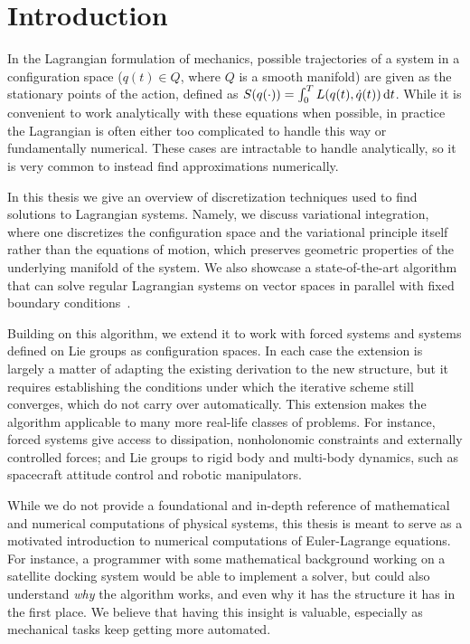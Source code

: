 \chapter{Introduction}

In the Lagrangian formulation of mechanics, possible trajectories of a system in a configuration space ($q(t) \in Q$, where $Q$ is a smooth manifold) are given as the stationary points of the action, defined as $S(q(\cdot)) =\int_0^T L(q(t), \dot{q}(t)) \odif{t}$. While it is convenient to work analytically with these equations when possible, in practice the Lagrangian is often either too complicated to handle this way or fundamentally numerical. These cases are intractable to handle analytically, so it is very common to instead find approximations numerically.

In this thesis we give an overview of discretization techniques used to find solutions to Lagrangian systems. Namely, we discuss variational integration, where one discretizes the configuration space and the variational principle itself rather than the equations of motion, which preserves geometric properties of the underlying manifold of the system. We also showcase a state-of-the-art algorithm that can solve regular Lagrangian systems on vector spaces in parallel with fixed boundary conditions~\cite{ferraroParallelIterativeMethod2025}.

Building on this algorithm, we extend it to work with forced systems and systems defined on Lie groups as configuration spaces. In each case the extension is largely a matter of adapting the existing derivation to the new structure, but it requires establishing the conditions under which the iterative scheme still converges, which do not carry over automatically. This extension makes the algorithm applicable to many more real-life classes of problems. For instance, forced systems give access to dissipation, nonholonomic constraints and externally controlled forces; and Lie groups to rigid body and multi-body dynamics, such as spacecraft attitude control and robotic manipulators.

While we do not provide a foundational and in-depth reference of mathematical and numerical computations of physical systems, this thesis is meant to serve as a motivated introduction to numerical computations of Euler-Lagrange equations. For instance, a programmer with some mathematical background working on a satellite docking system would be able to implement a solver, but could also understand \emph{why} the algorithm works, and even why it has the structure it has in the first place. We believe that having this insight is valuable, especially as mechanical tasks keep getting more automated.

